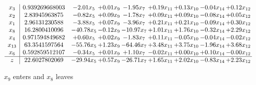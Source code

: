 \documentclass[8pt]{article}
\begin{document}
 \[\begin{array}{c| c c@{\hskip 2pt} c@{\hskip 2pt} c@{\hskip 2pt} c@{\hskip 2pt} c@{\hskip 2pt} c@{\hskip 2pt} c@{\hskip 2pt} }
 x_{3}   &  0.939269668003 & -2.01 x_{5} & +  0.01 x_{9} & -1.95 x_{7} & +  0.19 x_{11} & +  0.13 x_{10} & -0.04 x_{14} & +  0.12 x_{12}\\
 x_{2}   &  2.83945963875 & -0.82 x_{5} & +  0.09 x_{9} & -1.78 x_{7} & +  0.09 x_{11} & +  0.09 x_{10} & -0.08 x_{14} & +  0.05 x_{12}\\
 x_{1}   &  2.96131230588 & -3.88 x_{5} & +  0.07 x_{9} & -3.96 x_{7} & +  0.21 x_{11} & +  0.21 x_{10} & -0.09 x_{14} & +  0.30 x_{12}\\
 x_{8}   &  16.2800410096 & -40.78 x_{5} & -0.12 x_{9} & -10.97 x_{7} & +  1.01 x_{11} & +  1.76 x_{10} & -0.32 x_{14} & +  2.29 x_{12}\\
 x_{4}   &  0.971594849682 & +  0.60 x_{5} & +  0.02 x_{9} & -1.83 x_{7} & +  0.11 x_{11} & -0.05 x_{10} & -0.04 x_{14} & -0.02 x_{12}\\
 x_{13}   &  63.3541597564 & -55.76 x_{5} & +  1.23 x_{9} & -64.46 x_{7} & +  3.48 x_{11} & +  3.75 x_{10} & -1.96 x_{14} & +  3.68 x_{12}\\
 x_{6}   &  0.592859512107 & -0.34 x_{5} & +  0.01 x_{9} & +  1.10 x_{7} & -0.02 x_{11} & +  0.00 x_{10} & +  0.10 x_{14} & -0.00 x_{12}\\
\hline
z    &  22.6027802069 & -29.94 x_{5} & +  0.57 x_{9} & -26.71 x_{7} & +  1.65 x_{11} & +  2.02 x_{10} & -0.83 x_{14} & +  2.23 x_{12}\\
\end{array}\]


 $ x_{9} $ enters and $ x_{8} $ leaves 
\end{document}
